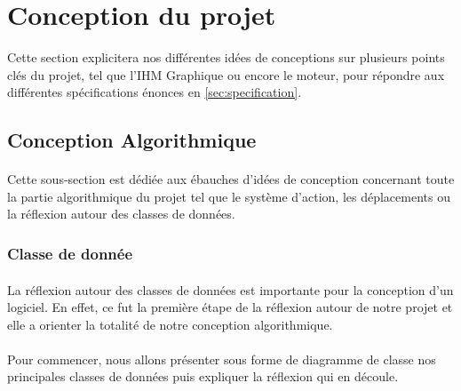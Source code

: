 \newpage
\section{Conception du projet}
\label{sec:concept}

\noindent Cette section explicitera nos différentes idées de conceptions sur plusieurs points clés du projet, tel que l'IHM Graphique ou encore le moteur, pour répondre aux différentes spécifications énonces en \ref{sec:specification}.

\subsection{Conception Algorithmique}

\paragraph{}
    Cette sous-section est dédiée aux ébauches d'idées de conception concernant toute la partie algorithmique du projet tel que le système d'action, les déplacements ou la réflexion autour des classes de données.

\subsubsection{Classe de donnée}
\label{sec:donnee}

\paragraph{}
    La réflexion autour des classes de données est importante pour la conception d'un logiciel. En effet, ce fut la première étape de la réflexion autour de notre projet et elle a orienter la totalité de notre conception algorithmique.

\paragraph{}
    Pour commencer, nous allons présenter sous forme de diagramme de classe nos principales classes de données puis expliquer la réflexion qui en découle.


